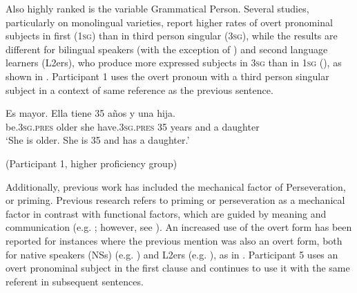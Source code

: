 \documentclass[output=paper,colorlinks,citecolor=brown,draftmode]{langscibook}
\begin{document}
Also highly ranked is the variable Grammatical Person. Several studies, particularly on monolingual varieties, report higher rates of overt pronominal subjects in first (1\textsc{sg}) than in third person singular (3\textsc{sg}), while the results are different for bilingual speakers (with the exception of  \citealt{TravisCacoullos2012}) and second language learners (L2ers), who produce more expressed subjects in 3\textsc{sg} than in 1\textsc{sg} (\citealt{GeeslinGudmestad2011, GeeslinGudmestad2016, GudmestadGeeslin2010, GudmestadGeeslin2013,
Lozano2009, Lozano2016, PradaPérezFeroce2020}), as shown in . Participant 1 uses the overt pronoun with a third person singular subject in a context of same reference as the previous sentence.


\ea\label{ex:14:2}
\gll Es mayor. Ella tiene 35 años y una hija.\\
     be.\textsc{3sg}.\textsc{pres} older she have.\textsc{3sg}.\textsc{pres} 35 years and a daughter\\
\glt ‘She is older. She is 35 and has a daughter.'
\begin{flushright}
(Participant 1, higher proficiency group)
\end{flushright}
\z
{} %

Additionally, previous work has included the mechanical factor of Perseveration, or priming. Previous research refers to priming or perseveration as a mechanical factor in contrast with functional factors, which are guided by meaning and communication (e.g. \citealp{TravisCacoullos2012}; however, see \citealp{Otheguy2015}). An increased use of the overt form has been reported for instances where the previous mention was also an overt form, both for native speakers (NSs) (e.g. \citealp{Cameron1994}) and L2ers (e.g. \citealp{Abreu2009}), as in . Participant 5 uses an overt pronominal subject in the first clause and continues to use it with the same referent in subsequent sentences.
\end{document}
